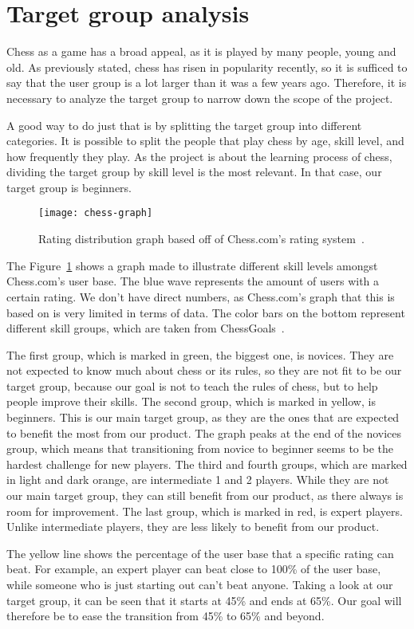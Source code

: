 \section{Target group analysis}\label{sec:target-group-analysis}

Chess as a game has a broad appeal, as it is played by many people, young and old.
As previously stated, chess has risen in popularity recently, so it is sufficed to say that the user group is a lot
larger than it was a few years ago.
Therefore, it is necessary to analyze the target group to narrow down the scope of the project.

A good way to do just that is by splitting the target group into different categories.
It is possible to split the people that play chess by age, skill level, and how frequently they play.
As the project is about the learning process of chess, dividing the target group by skill level is the most relevant.
In that case, our target group is beginners.


\begin{figure}
    \centering
    \texttt{[image: chess-graph]}
    \caption{Rating distribution graph based off of Chess.com's rating system~\cite{chess-ratings}.}\label{fig:graph}
\end{figure}

The Figure~\ref{fig:graph} shows a graph made to illustrate different skill levels amongst Chess.com's user base.
The blue wave represents the amount of users with a certain rating.
We don't have direct numbers, as Chess.com's graph that this is based on is very limited in terms of data.
The color bars on the bottom represent different skill groups, which are taken from ChessGoals~\cite{chess-ratings}.


The first group, which is marked in green, the biggest one, is novices. 
They are not expected to know much about chess or its rules, so they are not fit to be our target group, because our 
goal is not to teach the rules of chess, but to help people improve their skills.
The second group, which is marked in yellow, is beginners.
This is our main target group, as they are the ones that are expected to benefit the most from our product.
The graph peaks at the end of the novices group, which means that transitioning from novice to beginner seems to be the 
hardest challenge for new players.
The third and fourth groups, which are marked in light and dark orange, are intermediate 1 and 2 players.
While they are not our main target group, they can still benefit from our product, as there always is room for 
improvement.
The last group, which is marked in red, is expert players.
Unlike intermediate players, they are less likely to benefit from our product.

The yellow line shows the percentage of the user base that a specific rating can beat.
For example, an expert player can beat close to 100\% of the user base, while someone who is just starting out can't
beat anyone.
Taking a look at our target group, it can be seen that it starts at 45\% and ends at 65\%.
Our goal will therefore be to ease the transition from 45\% to 65\% and beyond.
